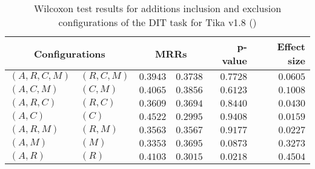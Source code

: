 
\begin{table}
\begin{spacing}{1.2}
\centering
\caption{Wilcoxon test results for additions inclusion and exclusion configurations of the DIT task for Tika v1.8 (\ctwo)}
\label{table:versus-wilcox-tika-dit-additions}
\begin{tabular}{ll|rr|rr}
\toprule
      \multicolumn{2}{c|}{Configurations} &                \multicolumn{2}{c|}{MRRs} &             p-value & Effect size \\
\midrule
 $(A,R,C,M)$ &  $(R,C,M)$ &  $\bm{0.3943}$ &       $0.3738$ & $0.7728$ &    $0.0605$ \\
   $(A,C,M)$ &    $(C,M)$ &  $\bm{0.4065}$ &       $0.3856$ & $0.6123$ &    $0.1008$ \\
   $(A,R,C)$ &    $(R,C)$ &       $0.3609$ &  $\bm{0.3694}$ & $0.8440$ &    $0.0430$ \\
     $(A,C)$ &      $(C)$ &  $\bm{0.4522}$ &       $0.2995$ & $0.9408$ &    $0.0159$ \\
   $(A,R,M)$ &    $(R,M)$ &       $0.3563$ &  $\bm{0.3567}$ & $0.9177$ &    $0.0227$ \\
     $(A,M)$ &      $(M)$ &       $0.3353$ &  $\bm{0.3695}$ & $0.0873$ &    $0.3273$ \\
     $(A,R)$ &      $(R)$ &  $\bm{0.4103}$ &       $0.3015$ & $0.0218$ &    $0.4504$ \\
\bottomrule
\end{tabular}

\end{spacing}
\end{table}

